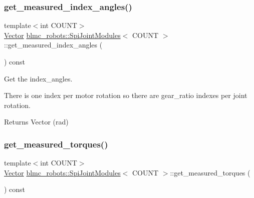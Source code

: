 \subsubsection{\texorpdfstring{get\+\_\+measured\+\_\+index\+\_\+angles()}{get\_measured\_index\_angles()}}
{\footnotesize\ttfamily template$<$int C\+O\+U\+NT$>$ \\
\hyperlink{classblmc__robots_1_1SpiJointModules_a2d48f81ec41a42a240e80cd22d4fa2f8}{Vector} \hyperlink{classblmc__robots_1_1SpiJointModules}{blmc\+\_\+robots\+::\+Spi\+Joint\+Modules}$<$ C\+O\+U\+NT $>$\+::get\+\_\+measured\+\_\+index\+\_\+angles (\begin{DoxyParamCaption}{ }\end{DoxyParamCaption}) const\hspace{0.3cm}{\ttfamily [inline]}}



Get the index\+\_\+angles. 

There is one index per motor rotation so there are gear\+\_\+ratio indexes per joint rotation.

\begin{DoxyReturn}{Returns}
Vector (rad) 
\end{DoxyReturn}
\mbox{\label{classblmc__robots_1_1SpiJointModules_ae244269604abea4bff4c1199820e36a5}} 
\subsubsection{\texorpdfstring{get\+\_\+measured\+\_\+torques()}{get\_measured\_torques()}}
{\footnotesize\ttfamily template$<$int C\+O\+U\+NT$>$ \\
\hyperlink{classblmc__robots_1_1SpiJointModules_a2d48f81ec41a42a240e80cd22d4fa2f8}{Vector} \hyperlink{classblmc__robots_1_1SpiJointModules}{blmc\+\_\+robots\+::\+Spi\+Joint\+Modules}$<$ C\+O\+U\+NT $>$\+::get\+\_\+measured\+\_\+torques (\begin{DoxyParamCaption}{ }\end{DoxyParamCaption}) const\hspace{0.3cm}{\ttfamily [inline]}}



